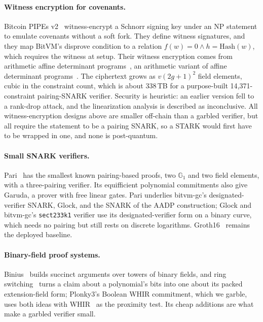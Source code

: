 \documentclass[11pt]{article}
\begin{document}
\paragraph{Witness encryption for covenants.} Bitcoin PIPEs v2~\cite{pipesv2}
witness-encrypt a Schnorr signing key under an NP statement to emulate covenants
without a soft fork. They define witness signatures, and they map BitVM's disprove
condition to a relation $f(w)=0\wedge h=\mathrm{Hash}(w)$, which requires the
witness at setup. Their witness encryption comes from arithmetic affine
determinant programs~\cite{aadp2026}, an arithmetic variant of affine determinant
programs~\cite{bij20adp}. The ciphertext grows as $v(2g+1)^2$ field elements,
cubic in the constraint count, which is about 338\,TB for a purpose-built
14{,}371-constraint pairing-SNARK verifier. Security is heuristic: an earlier
version fell to a rank-drop attack, and the linearization analysis is described
as inconclusive. All witness-encryption designs above are smaller off-chain than a
garbled verifier, but all require the statement to be a pairing SNARK, so a STARK
would first have to be wrapped in one, and none is post-quantum.

\paragraph{Small SNARK verifiers.} Pari~\cite{garudapari} has the smallest known
pairing-based proofs, two $\mathbb{G}_1$ and two field elements, with a
three-pairing verifier. Its equifficient polynomial commitments also give Garuda,
a prover with free linear gates. Pari underlies bitvm-gc's designated-verifier
SNARK, Glock, and the SNARK of the AADP construction; Glock and bitvm-gc's
\texttt{sect233k1} verifier use its designated-verifier form on a binary curve,
which needs no pairing but still rests on discrete logarithms. Groth16~\cite{gro16} remains
the deployed baseline.

\paragraph{Binary-field proof systems.} Binius~\cite{dp25binius} builds succinct
arguments over towers of binary fields, and ring switching~\cite{dp24ringswitch}
turns a claim about a polynomial's bits into one about its packed extension-field
form; Plonky3's Boolean WHIR commitment, which we garble, uses both ideas with
WHIR~\cite{whir25} as the proximity test. Its cheap additions are what make a
garbled verifier small.
\end{document}
